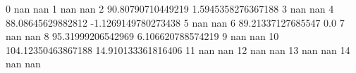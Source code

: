 0 nan nan
1 nan nan
2 90.80790710449219 1.5945358276367188
3 nan nan
4 88.08645629882812 -1.1269149780273438
5 nan nan
6 89.21337127685547 0.0
7 nan nan
8 95.31999206542969 6.106620788574219
9 nan nan
10 104.12350463867188 14.910133361816406
11 nan nan
12 nan nan
13 nan nan
14 nan nan
